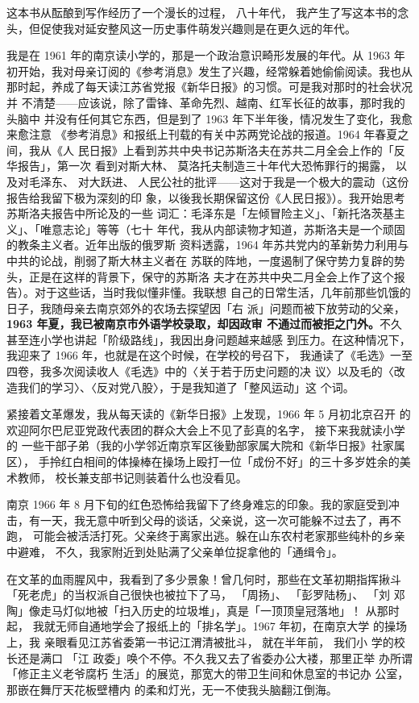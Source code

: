 \begin{preface}
	
这本书从酝酿到写作经历了一个漫长的过程，
八十年代，
我产生了写这本书的念
头，但促使我对延安整风这一历史事件萌发兴趣则是在更久远的年代。

我是在 1961 年的南京读小学的，那是一个政治意识畸形发展的年代。从 1963
年初开始，我对母亲订阅的《参考消息》发生了兴趣，经常躲着她偷偷阅读。我也从
那时起，养成了每天读江苏省党报《新华日报》的习惯。可是我对那时的社会状况并
不清楚——应该说，除了雷锋、革命先烈、越南、红军长征的故事，那时我的头脑中
并没有任何其它东西，但是到了 1963 年下半年後，情况发生了变化，我愈来愈注意
《参考消息》和报纸上刊载的有关中苏两党论战的报道。1964 年春夏之间，我从《人
民日报》上看到苏共中央书记苏斯洛夫在苏共二月全会上作的「反华报告」，第一次
看到对斯大林、
莫洛托夫制造三十年代大恐怖罪行的揭露，
以及对毛泽东、
对大跃进、
人民公社的批评——这对于我是一个极大的震动（这份报告给我留下极为深刻的印
象，以後我长期保留这份《人民日报》）。我开始思考苏斯洛夫报告中所论及的一些
词汇：毛泽东是「左倾冒险主义」、「新托洛茨基主义」、「唯意志论」等等（七十
年代，我从内部读物才知道，苏斯洛夫是一个顽固的教条主义者。近年出版的俄罗斯
资料透露，1964 年苏共党内的革新势力利用与中共的论战，削弱了斯大林主义者在
苏联的阵地，一度遏制了保守势力复辟的势头，正是在这样的背景下，保守的苏斯洛
夫才在苏共中央二月全会上作了这个报告）。对于这些话，当时我似懂非懂。我联想
自己的日常生活，几年前那些饥饿的日子，我随母亲去南京郊外的农场去探望因「右
派」问题而被下放劳动的父亲，{\bf 1963 年夏，我已被南京市外语学校录取，却因政审
不通过而被拒之门外。}不久甚至连小学也讲起「阶级路线」，我因出身问题越来越感
到压力。在这种情况下，我迎来了 1966 年，也就是在这个时候，在学校的号召下，
我通读了《毛选》一至四卷，我多次阅读收人《毛选》中的〈关于若于历史问题的决
议〉以及毛的〈改造我们的学习〉、〈反对党八股〉，于是我知道了「整风运动」这
个词。

紧接着文革爆发，我从每天读的《新华日报》上发现，1966 年 5 月初北京召开
的欢迎阿尔巴尼亚党政代表团的群众大会上不见了彭真的名字，
接下来我就读小学的
一些干部子弟（我的小学邻近南京军区後勤部家属大院和《新华日报》社家属区），
手拎红白相间的体操棒在操场上殴打一位「成份不好」的三十多岁姓余的美术教师，
校长兼支部书记则装着什么也没看见。

南京 1966 年 8 月下旬的红色恐怖给我留下了终身难忘的印象。我的家庭受到冲
击，有一天，我无意中听到父母的谈话，父亲说，这一次可能躲不过去了，再不跑，
可能会被活活打死。父亲终于离家出逃。躲在山东农村老家那些纯朴的乡亲中避难，
不久，我家附近到处贴满了父亲单位捉拿他的「通缉令」。

在文革的血雨腥风中，我看到了多少景象！曾几何时，那些在文革初期指挥揪斗
「死老虎」的当权派自己很快也被拉下了马， 「周扬」、 「彭罗陆杨」、
「刘 邓陶」像走马灯似地被「扫入历史的垃圾堆」，真是「一顶顶皇冠落地」！
从那时起， 我就无师自通地学会了报纸上的「排名学」。1967 年初，在南京大学
的操场上，我 亲眼看见江苏省委第一书记江渭清被批斗， 就在半年前， 我们小
学的校长还是满口 「江 政委」唤个不停。不久我又去了省委办公大褛，那里正举
办所谓「修正主义老爷腐朽 生活」的展览，那宽大的带卫生间和休息室的书记办
公室，那嵌在舞厅天花板壁槽内 的柔和灯光，无一不使我头脑翻江倒海。


\end{preface}
